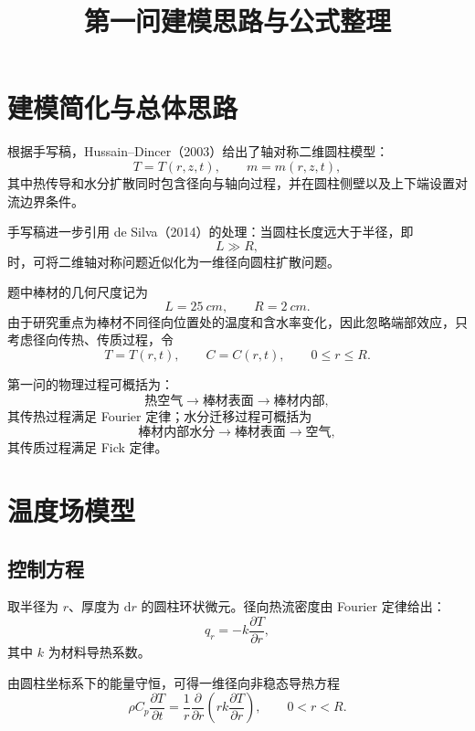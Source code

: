 \documentclass[UTF8,a4paper,12pt]{ctexart}
\title{第一问建模思路与公式整理}
\author{}
\date{}
\begin{document}
\maketitle

\section{建模简化与总体思路}

根据手写稿，Hussain--Dincer（2003）给出了轴对称二维圆柱模型：
\begin{equation}
    T=T(r,z,t),\qquad m=m(r,z,t),
\end{equation}
其中热传导和水分扩散同时包含径向与轴向过程，并在圆柱侧壁以及上下端设置对流边界条件。

手写稿进一步引用 de Silva（2014）的处理：当圆柱长度远大于半径，即
\begin{equation}
    L\gg R,
\end{equation}
时，可将二维轴对称问题近似化为一维径向圆柱扩散问题。

题中棒材的几何尺度记为
\begin{equation}
    L=\SI{25}{cm},\qquad R=\SI{2}{cm}.
\end{equation}
由于研究重点为棒材不同径向位置处的温度和含水率变化，因此忽略端部效应，只考虑径向传热、传质过程，令
\begin{equation}
    T=T(r,t),\qquad C=C(r,t),\qquad 0\le r\le R.
\end{equation}

第一问的物理过程可概括为：
\[
\text{热空气}\longrightarrow\text{棒材表面}\longrightarrow\text{棒材内部},
\]
其传热过程满足 Fourier 定律；水分迁移过程可概括为
\[
\text{棒材内部水分}\longrightarrow\text{棒材表面}\longrightarrow\text{空气},
\]
其传质过程满足 Fick 定律。

\section{温度场模型}

\subsection{控制方程}

取半径为 $r$、厚度为 $\mathrm{d}r$ 的圆柱环状微元。径向热流密度由 Fourier 定律给出：
\begin{equation}
    q_r=-k\frac{\partial T}{\partial r},
\end{equation}
其中 $k$ 为材料导热系数。

由圆柱坐标系下的能量守恒，可得一维径向非稳态导热方程
\begin{equation}
    \rho C_p\frac{\partial T}{\partial t}
    =
    \frac{1}{r}\frac{\partial}{\partial r}
    \left(
        r k\frac{\partial T}{\partial r}
    \right),
    \qquad 0<r<R.
    \label{eq:heat-pde}
\end{equation}
\end{document}
